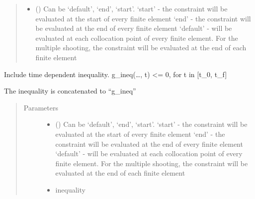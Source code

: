 \documentclass[letterpaper,10pt,english]{sphinxmanual}
\begin{document}
\begin{fulllineitems}
\begin{fulllineitems}
\begin{quote}
\begin{description}
\begin{itemize}
\item {} 
 () \textendash{} Can be ‘default’, ‘end’, ‘start’.
‘start’ - the constraint will be evaluated at the start of every finite element
‘end’ - the constraint will be evaluated at the end of every finite element
‘default’ - will be evaluated at each collocation point of every finite element.
For the multiple shooting, the constraint will be evaluated at the end of each
finite element

\end{itemize}

\end{description}\end{quote}

\end{fulllineitems}


\begin{fulllineitems}
\label{\detokenize{yaocptool.modelling:yaocptool.modelling.ocp.OptimalControlProblem.include_time_inequality}}
Include time dependent inequality.
g\_ineq(…, t) \textless{}= 0, for t in {[}t\_0, t\_f{]}

The inequality is concatenated to “g\_ineq”
\begin{quote}\begin{description}
\item[{Parameters}] \leavevmode\begin{itemize}
\item {} 
 () \textendash{} Can be ‘default’, ‘end’, ‘start’.
‘start’ - the constraint will be evaluated at the start of every finite element
‘end’ - the constraint will be evaluated at the end of every finite element
‘default’ - will be evaluated at each collocation point of every finite element.
For the multiple shooting, the constraint will be evaluated at the end of each
finite element

\item {} 
 \textendash{} inequality

\end{itemize}

\end{description}\end{quote}


\end{fulllineitems}
\end{fulllineitems}
\end{document}
